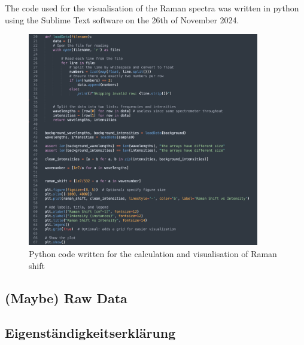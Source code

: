 The code used for the visualisation of the Raman spectra was written in python using the Sublime Text software on the 26th of November 2024.
\\


\begin{figure}[h]
    \centering
    \includegraphics[width=0.9\textwidth]{images/code_raman_shift.png}
    \caption{Python code written for the calculation and visualisation of Raman shift}
    \label{fig:python}
\end{figure}

\subsection*{(Maybe) Raw Data}
\subsection*{Eigenständigkeitserklärung}